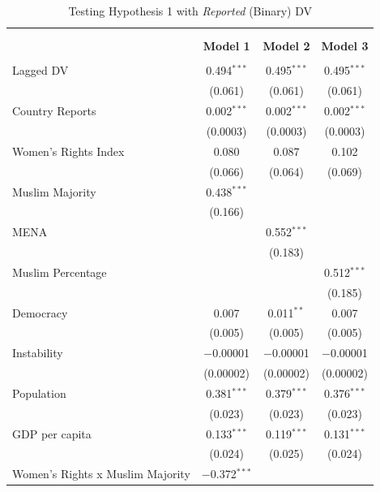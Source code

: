 \documentclass[11pt, oneside]{article}
\begin{document}
\begin{table}[!htbp] \centering 
  \caption{Testing Hypothesis 1 with \emph{Reported} (Binary) DV}
  \label{table:logit} 
\begin{tabular}{@{\extracolsep{5pt}}lccc} 
\\[-1.8ex]\hline \\[-1.8ex] 
\\[-1.8ex] & \textbf{Model 1} & \textbf{Model 2} & \textbf{Model 3}\\ 
\hline \\[-1.8ex] 
 Lagged DV & 0.494$^{***}$ & 0.495$^{***}$ & 0.495$^{***}$ \\ 
  & (0.061) & (0.061) & (0.061) \\ 
  Country Reports & 0.002$^{***}$ & 0.002$^{***}$ & 0.002$^{***}$ \\ 
  & (0.0003) & (0.0003) & (0.0003) \\ 
  Women's Rights Index & 0.080 & 0.087 & 0.102 \\ 
  & (0.066) & (0.064) & (0.069) \\ 
  Muslim Majority & 0.438$^{***}$ &  &  \\ 
  & (0.166) &  &  \\ 
  MENA &  & 0.552$^{***}$ &  \\ 
  &  & (0.183) &  \\ 
  Muslim Percentage &  &  & 0.512$^{***}$ \\ 
  &  &  & (0.185) \\ 
  Democracy & 0.007 & 0.011$^{**}$ & 0.007 \\ 
  & (0.005) & (0.005) & (0.005) \\ 
  Instability & $-$0.00001 & $-$0.00001 & $-$0.00001 \\ 
  & (0.00002) & (0.00002) & (0.00002) \\ 
  Population & 0.381$^{***}$ & 0.379$^{***}$ & 0.376$^{***}$ \\ 
  & (0.023) & (0.023) & (0.023) \\ 
  GDP per capita & 0.133$^{***}$ & 0.119$^{***}$ & 0.131$^{***}$ \\ 
  & (0.024) & (0.025) & (0.024) \\ 
  Women's Rights x Muslim Majority & $-$0.372$^{***}$ &  &  \\ 

\end{tabular}
\end{table}
\end{document}
